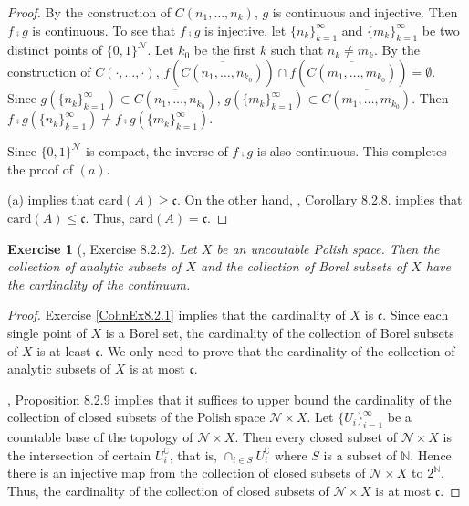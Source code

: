 \documentclass[11pt]{article}
\theoremstyle{plain}
\newtheorem{exercise}{Exercise}
\theoremstyle{definition}
\theoremstyle{remark}
\begin{document}
\begin{proof}
    By the construction of $C(n_1,\dots,n_k)$, $g$ is continuous and injective.
    Then $f\comp g$ is continuous.
    To see that $f\comp g$ is injective, let $\{n_k\}_{k=1}^\infty$ and $\{m_k\}_{k=1}^\infty$ be two distinct points of $\{0,1\}^{\mathscr N}$.
    Let $k_0$ be the first $k$ such that $n_k \neq m_k$.
    By the construction of $C(\cdot,\dots, \cdot)$, $f(\overline{C(n_1,\dots,n_{k_0})}) \cap  f(\overline{C(m_1,\dots,m_{k_0})}) = \emptyset$.
    Since $g(\{n_k\}_{k=1}^\infty) \subset \overline{C(n_1,\dots,n_{k_0})}$, $g(\{m_k\}_{k=1}^\infty) \subset \overline{C(m_1,\dots,m_{k_0})}$.
    Then $f \comp g (\{n_k\}_{k=1}^\infty ) \neq f \comp g (\{m_k\}_{k=1}^\infty ) $.

    Since $\{0,1\}^{\mathscr N}$ is compact, the inverse of $f \comp g$ is also continuous. 
    This completes the proof of $(a)$.

    (a) implies that $\textrm{card}(A) \geq \mathfrak c $.
    On the other hand, \cite{book:992991}, Corollary 8.2.8. implies that $\textrm{card}(A) \leq \mathfrak c$.
    Thus, $\textrm{card}(A) = \mathfrak c $.

\end{proof}

\begin{exercise}[\cite{book:992991}, Exercise 8.2.2]
    Let $X$ be an uncoutable Polish space.
    Then the collection of analytic subsets of $X$ and the collection of Borel subsets of $X$ have the cardinality of the continuum.
    \label{CohnEx8.2.2}
\end{exercise}
\begin{proof}
    Exercise \ref{CohnEx8.2.1} implies that the cardinality of $X$ is $\mathfrak c$.
    Since each single point of $X$ is a Borel set, the cardinality of the collection of Borel subsets of $X$ is at least $\mathfrak c$.
    We only need to prove that the cardinality of the collection of analytic subsets of $X$ is at most $\mathfrak c$.

    \cite{book:992991}, Proposition 8.2.9 implies that it suffices to upper bound the cardinality of the collection of closed subsets of the Polish space $\mathscr N \times X$.
    Let $\{U_i\}_{i=1}^\infty$ be a countable base of the topology of $\mathscr N \times X$.
    Then every closed subset of $\mathscr N \times X$ is the intersection of certain $U_i^\complement$, that is, $\cap_{i\in S} U_i^{\complement}$ where $S$ is a subset of $\mathbb N$.
    Hence there is an injective map from the collection of closed subsets of $\mathscr N \times X$ to $2^{\mathbb N}$.
    Thus, the cardinality of the collection of closed subsets of $\mathscr N \times X$ is at most $\mathfrak c$.

\end{proof}
\end{document}
